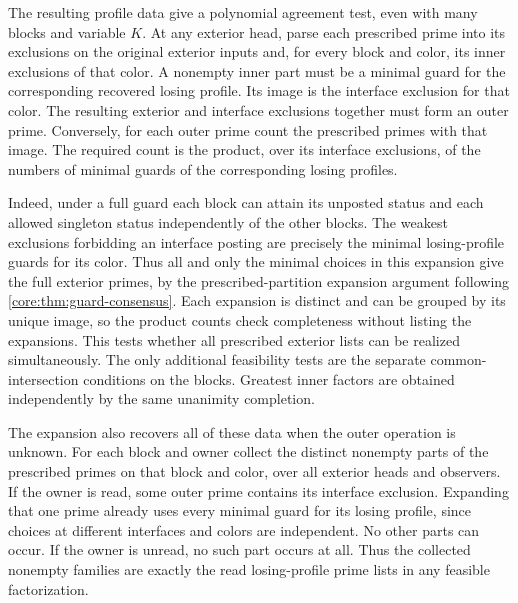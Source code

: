 The resulting profile data give a polynomial agreement test,
even with many blocks and variable $K$. At any exterior head,
parse each prescribed prime into its exclusions on the original
exterior inputs and, for every block and color, its inner
exclusions of that color. A nonempty inner part must be a
minimal guard for the corresponding recovered losing profile.
Its image is the interface exclusion for that color. The
resulting exterior and interface exclusions together must form
an outer prime. Conversely, for each outer prime count the
prescribed primes with that image. The required count is the
product, over its interface exclusions, of the numbers of
minimal guards of the corresponding losing profiles.

Indeed, under a full guard each block can attain its unposted
status and each allowed singleton status independently of the
other blocks. The weakest exclusions forbidding an interface
posting are precisely the minimal losing-profile guards for its
color. Thus all and only the minimal choices in this expansion
give the full exterior primes, by the prescribed-partition
expansion argument following \cref{core:thm:guard-consensus}.
Each expansion is distinct and can be grouped by its unique
image, so the product counts check completeness without listing
the expansions. This tests whether all prescribed exterior
lists can be realized simultaneously. The only additional
feasibility tests are the separate common-intersection
conditions on the blocks. Greatest inner factors are obtained
independently by the same unanimity completion.

The expansion also recovers all of these data when the outer
operation is unknown. For each block and owner collect the distinct
nonempty parts of the prescribed primes on that block and color,
over all exterior heads and observers. If the owner is read, some
outer prime contains its interface exclusion. Expanding that one
prime already uses every minimal guard for its losing profile,
since choices at different interfaces and colors are independent.
No other parts can occur. If the owner is unread, no such part
occurs at all. Thus the collected nonempty families are exactly
the read losing-profile prime lists in any feasible factorization.

